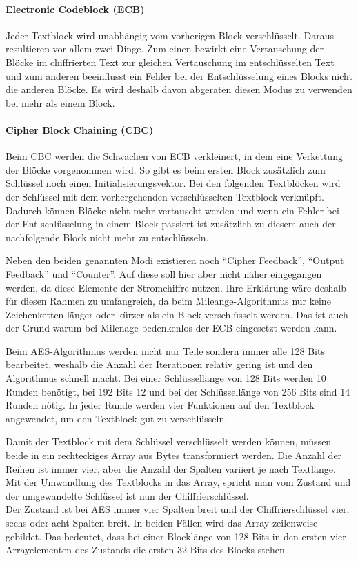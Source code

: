   \paragraph{Electronic Codeblock (ECB)}
   Jeder Textblock wird unabhängig vom vorherigen Block verschlüsselt. Daraus resultieren vor allem
   zwei Dinge. Zum einen bewirkt eine Vertauschung der Blöcke im chiffrierten Text zur gleichen Vertauschung
   im entschlüsselten Text und zum anderen beeinflusst ein Fehler bei der Entschlüsselung eines Blocks
   nicht die anderen Blöcke. Es wird deshalb davon abgeraten diesen Modus zu verwenden bei mehr
   als einem Block.

  \paragraph{Cipher Block Chaining (CBC)}
   Beim CBC werden die Schwächen von ECB verkleinert, in dem eine Verkettung der Blöcke vorgenommen
   wird. So gibt es beim ersten Block zusätzlich zum Schlüssel noch einen Initialisierungsvektor. Bei den
   folgenden Textblöcken wird der Schlüssel mit dem vorhergehenden verschlüsselten Textblock
   verknüpft. Dadurch können Blöcke nicht mehr vertauscht werden und wenn ein Fehler bei der Ent\-
   schlüsselung in einem Block passiert ist zusätzlich zu diesem auch der nachfolgende Block nicht mehr
   zu entschlüsseln.
   
  Neben den beiden genannten Modi existieren noch ``Cipher Feedback'', ``Output Feedback'' und
  ``Counter''. Auf diese soll hier aber nicht näher eingegangen werden, da diese Elemente der
  Stromchiffre nutzen. Ihre Erklärung wäre deshalb für diesen Rahmen zu umfangreich, da beim
  Mileange-Algorithmus nur keine Zeichenketten länger oder kürzer als ein Block verschlüsselt
  werden. Das ist auch der Grund warum bei Milenage bedenkenlos der ECB eingesetzt werden kann.
  
  Beim AES-Algorithmus werden nicht nur Teile sondern immer alle 128 Bits bearbeitet, weshalb die
  Anzahl der Iterationen relativ gering ist und den Algorithmus schnell macht. Bei einer Schlüssellänge
  von 128 Bits werden 10 Runden benötigt, bei 192 Bits 12 und bei der Schlüssellänge von 256 Bits
  sind 14 Runden nötig. In jeder Runde werden vier Funktionen auf den Textblock angewendet, um
  den Textblock gut zu verschlüsseln.
  
  Damit der Textblock mit dem Schlüssel verschlüsselt werden können, müssen beide in ein rechteckiges
  Array aus Bytes transformiert werden. Die Anzahl der Reihen ist immer vier, aber die Anzahl der Spalten
  variiert je nach Textlänge. Mit der Umwandlung des Textblocks in das Array, spricht man vom Zustand
  und der umgewandelte Schlüssel ist nun der Chiffrierschlüssel. \\
  Der Zustand ist bei AES immer vier Spalten breit und der Chiffrierschlüssel vier, sechs oder acht Spalten
  breit. In beiden Fällen wird das Array zeilenweise gebildet. Das bedeutet, dass bei einer Blocklänge von
  128 Bits in den ersten vier Arrayelementen des Zustands die ersten 32 Bits des Blocks stehen.
  

